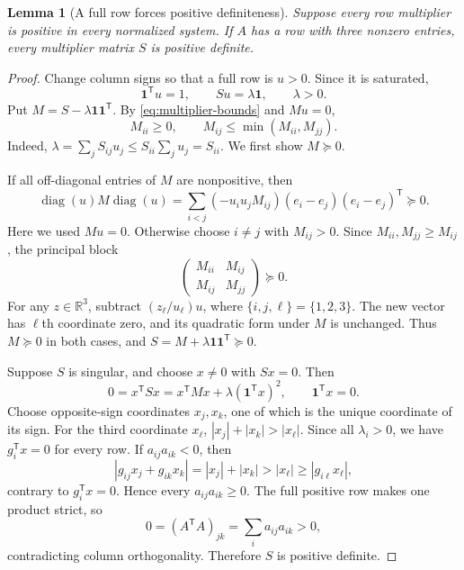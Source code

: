 \documentclass[11pt]{article}
\numberwithin{equation}{section}
\newtheorem{lemma}[lemma]{Lemma}
\theoremstyle{definition}
\theoremstyle{definition}
\newcommand{\R}{\mathbb R}
\DeclareMathOperator{\diag}{diag}
\begin{document}
\begin{lemma}[A full row forces positive definiteness]\label{lem:full-pd}
Suppose every row multiplier is positive in every normalized system.
If $A$ has a row with three nonzero entries, every multiplier matrix $S$
is positive definite.
\end{lemma}
\begin{proof}
Change column signs so that a full row is $u>0$. Since it is saturated,
\[
 \mathbf1^{\mathsf T}u=1,\qquad Su=\lambda\mathbf1,
 \qquad \lambda>0.
\]
Put $M=S-\lambda\mathbf1\mathbf1^{\mathsf T}$. By
\eqref{eq:multiplier-bounds} and $Mu=0$,
\[
 M_{ii}\ge0,\qquad M_{ij}\le\min(M_{ii},M_{jj}).
\]
Indeed, $\lambda=\sum_jS_{ij}u_j\le S_{ii}\sum_j u_j=S_{ii}$.
We first show $M\succeq0$.

If all off-diagonal entries of $M$ are nonpositive, then
\[
 \diag(u)M\diag(u)
 =\sum_{i<j}(-u_i u_j M_{ij})
   (e_i-e_j)(e_i-e_j)^{\mathsf T}\succeq0.
\]
Here we used $Mu=0$. Otherwise choose $i\ne j$ with $M_{ij}>0$.
Since $M_{ii},M_{jj}\ge M_{ij}$, the principal block
\[
 \begin{pmatrix}M_{ii}&M_{ij}\\M_{ij}&M_{jj}\end{pmatrix}
 \succeq0.
\]
For any $z\in\R^3$, subtract $(z_\ell/u_\ell)u$, where
$\{i,j,\ell\}=\{1,2,3\}$. The new vector has $\ell$th coordinate zero,
and its quadratic form under $M$ is unchanged. Thus $M\succeq0$ in
both cases, and $S=M+\lambda\mathbf1\mathbf1^{\mathsf T}\succeq0$.

Suppose $S$ is singular, and choose $x\ne0$ with $Sx=0$. Then
\[
 0=x^{\mathsf T}Sx=x^{\mathsf T}Mx
    +\lambda(\mathbf1^{\mathsf T}x)^2,
 \qquad \mathbf1^{\mathsf T}x=0.
\]
Choose opposite-sign coordinates $x_j,x_k$, one of which is the unique
coordinate of its sign. For the third coordinate $x_\ell$,
$|x_j|+|x_k|>|x_\ell|$. Since all $\lambda_i>0$, we have
$g_i^{\mathsf T}x=0$ for every row. If $a_{ij}a_{ik}<0$, then
\[
 |g_{ij}x_j+g_{ik}x_k|=|x_j|+|x_k|
 >|x_\ell|\ge|g_{i\ell}x_\ell|,
\]
contrary to $g_i^{\mathsf T}x=0$. Hence every
$a_{ij}a_{ik}\ge0$. The full positive row makes one product strict,
so
\[
 0=(A^{\mathsf T}A)_{jk}=\sum_i a_{ij}a_{ik}>0,
\]
contradicting column orthogonality. Therefore $S$ is positive definite.
\end{proof}
\end{document}
